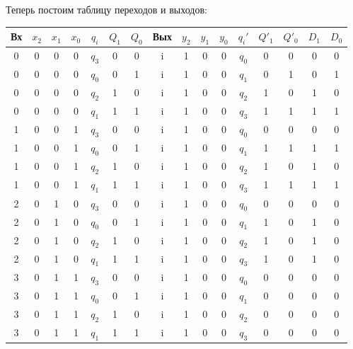 Теперь постоим таблицу переходов и выходов:
\begin{table}[H]
\centering
\begin{tabularx}{\textwidth}{|C|CCC|C|CC|C|CCC|C|CC|CC|}
    \hline
    \small{Вх} & $x_2$ & $x_1$ & $x_0$ & $q_i$ & $Q_1$ & $Q_0$ & \small{Вых} & $y_2$ & $y_1$ & $y_0$ & $q_i'$ & $Q'_1$ & $Q'_0$
                    & $D_1$ & $D_0$ \\
      & 0 & 0 & 0   &   $q_3$ & 0 & 0   &   i & 1 & 0 & 0   &  $q_0$ & 0 & 0   &   0 & 0   \\
    0  & 0 & 0 & 0   &   $q_0$ & 0 & 1   &   i & 1 & 0 & 0   &  $q_1$ & 0 & 1   &   0 & 1   \\
    0  & 0 & 0 & 0   &   $q_2$ & 1 & 0   &   i & 1 & 0 & 0   &  $q_2$ & 1 & 0   &   1 & 0   \\
    0  & 0 & 0 & 0   &   $q_1$ & 1 & 1   &   i & 1 & 0 & 0   &  $q_3$ & 1 & 1   &   1 & 1   \\
      & 0 & 0 & 1   &   $q_3$ & 0 & 0   &   i & 1 & 0 & 0   &  $q_0$ & 0 & 0   &   0 & 0   \\
    1  & 0 & 0 & 1   &   $q_0$ & 0 & 1   &   i & 1 & 0 & 0   &  $q_1$ & 1 & 1   &   1 & 1   \\
    1  & 0 & 0 & 1   &   $q_2$ & 1 & 0   &   i & 1 & 0 & 0   &  $q_2$ & 1 & 0   &   1 & 0   \\
    1  & 0 & 0 & 1   &   $q_1$ & 1 & 1   &   i & 1 & 0 & 0   &  $q_3$ & 1 & 1   &   1 & 1   \\
      & 0 & 1 & 0   &   $q_3$ & 0 & 0   &   i & 1 & 0 & 0   &  $q_0$ & 0 & 0   &   0 & 0   \\
    2  & 0 & 1 & 0   &   $q_0$ & 0 & 1   &   i & 1 & 0 & 0   &  $q_1$ & 1 & 0   &   1 & 0   \\
    2  & 0 & 1 & 0   &   $q_2$ & 1 & 0   &   i & 1 & 0 & 0   &  $q_2$ & 1 & 0   &   1 & 0   \\
    2  & 0 & 1 & 0   &   $q_1$ & 1 & 1   &   i & 1 & 0 & 0   &  $q_3$ & 1 & 0   &   1 & 0   \\
      & 0 & 1 & 1   &   $q_3$ & 0 & 0   &   i & 1 & 0 & 0   &  $q_0$ & 0 & 0   &   0 & 0   \\
    3  & 0 & 1 & 1   &   $q_0$ & 0 & 1   &   i & 1 & 0 & 0   &  $q_1$ & 0 & 0   &   0 & 0   \\
    3  & 0 & 1 & 1   &   $q_2$ & 1 & 0   &   i & 1 & 0 & 0   &  $q_2$ & 0 & 0   &   0 & 0   \\
    3  & 0 & 1 & 1   &   $q_1$ & 1 & 1   &   i & 1 & 0 & 0   &  $q_3$ & 0 & 0   &   0 & 0   \\

\end{tabularx}
\end{table}

